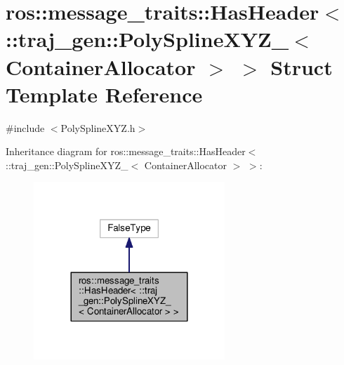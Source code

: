 \hypertarget{structros_1_1message__traits_1_1_has_header_3_01_1_1traj__gen_1_1_poly_spline_x_y_z___3_01_container_allocator_01_4_01_4}{}\section{ros\+:\+:message\+\_\+traits\+:\+:Has\+Header$<$ \+:\+:traj\+\_\+gen\+:\+:Poly\+Spline\+X\+Y\+Z\+\_\+$<$ Container\+Allocator $>$ $>$ Struct Template Reference}
\label{structros_1_1message__traits_1_1_has_header_3_01_1_1traj__gen_1_1_poly_spline_x_y_z___3_01_container_allocator_01_4_01_4}


{\ttfamily \#include $<$Poly\+Spline\+X\+Y\+Z.\+h$>$}



Inheritance diagram for ros\+:\+:message\+\_\+traits\+:\+:Has\+Header$<$ \+:\+:traj\+\_\+gen\+:\+:Poly\+Spline\+X\+Y\+Z\+\_\+$<$ Container\+Allocator $>$ $>$\+:
\nopagebreak
\begin{figure}[H]
\begin{center}
\leavevmode
\includegraphics[width=204pt]{structros_1_1message__traits_1_1_has_header_3_01_1_1traj__gen_1_1_poly_spline_x_y_z___3_01_conta486bb23ba43f9f78140b01e7f046e5bb}
\end{center}
\end{figure}


